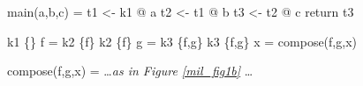 \begin{minipage}{5in}%
\begin{center}%
\begin{minipage}{4in}%
\begin{AVerb}[numbers=left]
main(a,b,c) = \label{mil_main_fig2}
  t1 <- k1 @ a \label{mil_t1_fig2}
  t2 <- t1 @ b \label{mil_t2_fig2}
  t3 <- t2 @ c \label{mil_t3_fig2}
  return t3

k1 \{\} f = k2 \{f\} \label{mil_k1_fig2}
k2 \{f\} g = k3 \{f,g\} \label{mil_k2_fig2}
k3 \{f,g\} x = compose(f,g,x) \label{mil_k3_fig2}

compose(f,g,x) = \dots \emph{as in Figure \ref{mil_fig1b}} \dots 
\end{AVerb}
\end{minipage}%
\end{center}%
\end{minipage}%

